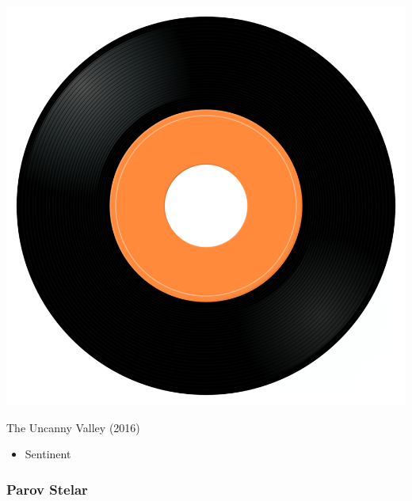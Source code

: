\begin{minipage}[t]{0.25\textwidth}\vspace{0pt}
\captionsetup{type=figure}
\includegraphics[width=\textwidth]{Images/cover.png}
\caption*{The Uncanny Valley (2016)}
\end{minipage}
\begin{minipage}[t]{0.25\textwidth}\vspace{0pt}
\begin{itemize}[nosep,leftmargin=1em,labelwidth=*,align=left]
	\setlength{\itemsep}{0pt}
	\item Sentinent
\end{itemize}
\end{minipage}

\subsubsection{Parov Stelar}

